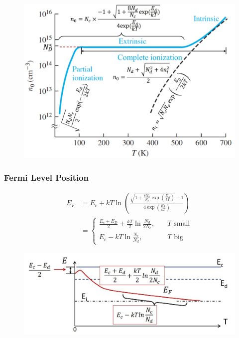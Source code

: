 \documentclass{beamer}
\begin{document}
    \begin{frame} \frametitle{}
        \begin{figure}[H]
            \centering
            \includegraphics[width=0.95\linewidth]{n0-versus-T.jpg}
            \label{fig:n0-versus-T.jpg}
        \end{figure}
    \end{frame}

    \begin{frame} \frametitle{Fermi Level Position}
        \begin{equation*}
            \begin{aligned}
                E_F &= E_c + kT \ln \left( \frac{\sqrt{1 + \frac{8 N_d}{N_c} \exp\left( \frac{E_A}{kT}  \right)} - 1}{4 \exp\left( \frac{E_A}{kT}  \right)}  \right) \\
                &= \left\{
                    \begin{aligned}
                        \frac{E_c + E_D}{2} +\frac{kT}{2} \ln \frac{N_d}{2N_c}, &\quad  T \text{ small} \\
                        E_c - kT \ln \frac{N_c}{N_d}, &\quad  T \text{ big}
                    \end{aligned}
                \right.
            \end{aligned}
        \end{equation*}
        \begin{figure}[H]
            \centering
            \includegraphics[width=0.8\linewidth]{Fermi-level-position.jpg}
            \label{fig:Fermi-level-position.jpg}
        \end{figure}
    \end{frame}
\end{document}
